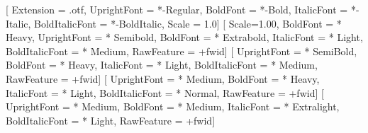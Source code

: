 \setmainfont{LibertinusSerif}[%
  Extension      = .otf,
  UprightFont    = *-Regular,
  BoldFont       = *-Bold,
  ItalicFont     = *-Italic,
  BoldItalicFont = *-BoldItalic,
  Scale          = 1.0]
\setmonofont{Iosevka Term}[%
  Scale=1.00,
  BoldFont        = * Heavy,
  UprightFont     = * Semibold,
  BoldFont        = * Extrabold,
  ItalicFont      = * Light,
  BoldItalicFont  = * Medium,
  RawFeature      = +fwid]
[ %
  UprightFont     = * SemiBold,
  BoldFont        = * Heavy,
  ItalicFont      = * Light,
  BoldItalicFont  = * Medium,
  RawFeature      = +fwid]
[ %
  UprightFont     = * Medium,
  BoldFont        = * Heavy,
  ItalicFont      = * Light,
  BoldItalicFont  = * Normal,
  RawFeature      = +fwid]  
[%
  UprightFont     = * Medium,
  BoldFont        = * Medium,
  ItalicFont      = * Extralight,
  BoldItalicFont  = * Light,
  RawFeature      = +fwid]

\newCJKfontfamily{}
\newCJKfontfamily{}
\newCJKfontfamily{}
\newCJKfontfamily{}


